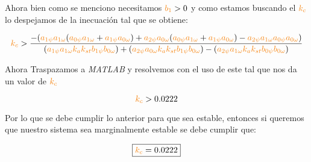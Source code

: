 Ahora bien como se menciono necesitamos $\nara{b_1} >0$ y como estamos buscando el \(\nara{k_c}\) lo despejamos de la inecuación tal que se obtiene:

\begin{equation}
    \nara{k_c} > \dfrac{-(\nara{a_{1\psi} a_{1\omega}}(\nara{a_{0\psi} a_{1\omega}} + \nara{a_{1\psi} a_{0\omega}}) + \nara{ a_{2\psi} a_{0\omega} }(\nara{a_{0\psi} a_{1\omega}} + \nara{a_{1\psi} a_{0\omega}}) - \nara{a_{2\psi} a_{1\omega} a_{0\psi} a_{0\omega}})}  {(\nara{a_{1\psi} a_{1\omega} k_a k_{st} b_{1\psi} b_{0\omega}}) + (\nara{a_{2\psi} a_{0\omega} k_a k_{st} b_{1\psi} b_{0\omega}}) - (\nara{a_{2\psi} a_{1\omega} k_a k_{st} b_{0\psi} b_{0\omega}})}
\end{equation}

Ahora Traspazamos a \textit{MATLAB} y resolvemos con el uso de este tal que nos da un valor de $\nara{k_c}$

\begin{equation}
    \nara{k_c} > 0.0222
\end{equation}

Por lo que se debe cumplir lo anterior para que sea estable, entonces si queremos que nuestro sistema sea marginalmente estable se debe cumplir que:

\begin{equation}
    \boxed{\nara{k_c} = 0.0222}
\end{equation}





